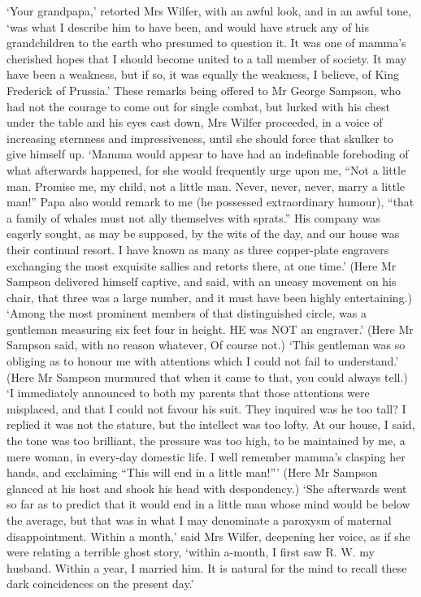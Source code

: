 ‘Your grandpapa,’ retorted Mrs Wilfer, with an awful look, and in an
awful tone, ‘was what I describe him to have been, and would have struck
any of his grandchildren to the earth who presumed to question it. It
was one of mamma’s cherished hopes that I should become united to a
tall member of society. It may have been a weakness, but if so, it was
equally the weakness, I believe, of King Frederick of Prussia.’ These
remarks being offered to Mr George Sampson, who had not the courage to
come out for single combat, but lurked with his chest under the table
and his eyes cast down, Mrs Wilfer proceeded, in a voice of increasing
sternness and impressiveness, until she should force that skulker
to give himself up. ‘Mamma would appear to have had an indefinable
foreboding of what afterwards happened, for she would frequently urge
upon me, “Not a little man. Promise me, my child, not a little man.
Never, never, never, marry a little man!” Papa also would remark to me
(he possessed extraordinary humour), “that a family of whales must not
ally themselves with sprats.” His company was eagerly sought, as may
be supposed, by the wits of the day, and our house was their continual
resort. I have known as many as three copper-plate engravers exchanging
the most exquisite sallies and retorts there, at one time.’ (Here Mr
Sampson delivered himself captive, and said, with an uneasy movement on
his chair, that three was a large number, and it must have been highly
entertaining.) ‘Among the most prominent members of that distinguished
circle, was a gentleman measuring six feet four in height. HE was NOT
an engraver.’ (Here Mr Sampson said, with no reason whatever, Of course
not.) ‘This gentleman was so obliging as to honour me with attentions
which I could not fail to understand.’ (Here Mr Sampson murmured that
when it came to that, you could always tell.) ‘I immediately announced
to both my parents that those attentions were misplaced, and that I
could not favour his suit. They inquired was he too tall? I replied it
was not the stature, but the intellect was too lofty. At our house,
I said, the tone was too brilliant, the pressure was too high, to be
maintained by me, a mere woman, in every-day domestic life. I well
remember mamma’s clasping her hands, and exclaiming “This will end in
a little man!”’ (Here Mr Sampson glanced at his host and shook his head
with despondency.) ‘She afterwards went so far as to predict that it
would end in a little man whose mind would be below the average, but
that was in what I may denominate a paroxysm of maternal disappointment.
Within a month,’ said Mrs Wilfer, deepening her voice, as if she were
relating a terrible ghost story, ‘within a-month, I first saw R. W. my
husband. Within a year, I married him. It is natural for the mind to
recall these dark coincidences on the present day.’


